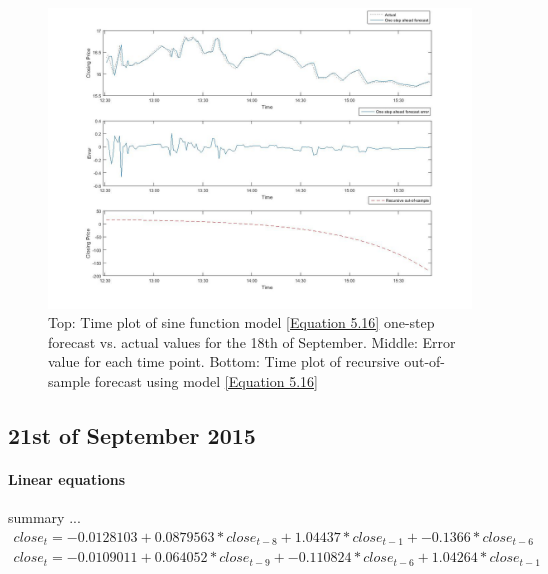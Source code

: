 \documentclass[13pt]{report}
\begin{document}
\begin{figure}[H]
\centering
\label{VWNonlinear18fig}
\includegraphics[width= \textwidth]{18nonlinear}
\caption{Top: Time plot of sine function model \ref{Equation 5.16} one-step forecast vs. actual values for the 18th of September. Middle: Error value for each time point. Bottom: Time plot of recursive out-of-sample forecast using model \ref{Equation 5.16}}
\end{figure}



\subsection{21st of September 2015}
\paragraph{Linear equations}\hfill \break
summary ...
\begin{equation}
\begin{align*}
close_{t} = -0.0128103 + 0.0879563 * close_{t-8} + 1.04437 * close_{t-1} + -0.1366 * close_{t-6}
\end{align*}
\label{Equation 5.17}
\end{equation}
\begin{equation}
\begin{align*}
close_{t} = -0.0109011 + 0.064052 * close_{t-9} + -0.110824 * close_{t-6} + 1.04264 * close_{t-1}
\end{align*}
\label{Equation 5.18}
\end{equation}
\end{document}
